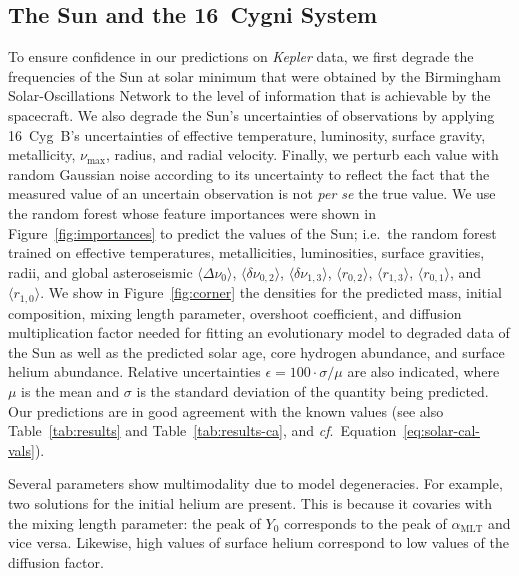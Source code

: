 \subsection{The Sun and the 16~Cygni System}
To ensure confidence in our predictions on \emph{Kepler} data, we first degrade the frequencies of the Sun at solar minimum that were obtained by the Birmingham Solar-Oscillations Network \citep[BiSON;][]{2014MNRAS.439.2025D} to the level of information that is achievable by the spacecraft. We also degrade the Sun's uncertainties of  observations by applying 16~Cyg~B's uncertainties of effective temperature, luminosity, surface gravity, metallicity, $\nu_{\max}$, radius, and radial velocity. Finally, we perturb each value with random Gaussian noise according to its uncertainty to reflect the fact that the measured value of an uncertain observation is not \emph{per se} the true value. We use the random forest whose feature importances were shown in Figure~\ref{fig:importances} to predict the values of the Sun; i.e.\ the random forest trained on effective temperatures, metallicities, luminosities, surface gravities, radii, and global asteroseismic  $\langle \Delta\nu_0 \rangle$, $\langle \delta\nu_{0,2} \rangle$, $\langle \delta\nu_{1,3} \rangle$, $\langle r_{0,2} \rangle$, $\langle r_{1,3} \rangle$, $\langle r_{0,1} \rangle$, and $\langle r_{1,0} \rangle$. We show in Figure~\ref{fig:corner} the densities for the predicted mass, initial composition, mixing length parameter, overshoot coefficient, and diffusion multiplication factor needed for fitting an evolutionary model to degraded data of the Sun as well as the predicted solar age, core hydrogen abundance, and surface helium abundance.  Relative uncertainties ${\epsilon=100\cdot\sigma/\mu}$ are also indicated, where $\mu$ is the mean and $\sigma$ is the standard deviation of the quantity being predicted. Our predictions are in good agreement with the known values (see also Table~\ref{tab:results} and Table~\ref{tab:results-ca}, and \emph{cf}.~Equation~\ref{eq:solar-cal-vals}). 

Several parameters show multimodality due to model degeneracies. For example, two solutions for the initial helium are present. This is because it covaries with the mixing length parameter: the peak of  $Y_0$ corresponds to the peak of  $\alpha_{\text{MLT}}$ and vice versa. Likewise, high values of surface helium correspond to low values of the diffusion  factor. 

